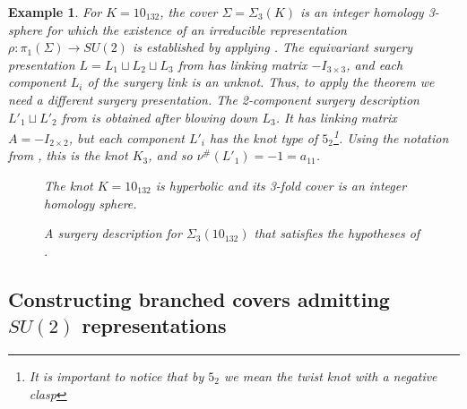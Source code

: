 \documentclass[11pt]{amsart}
\newtheorem{exmp}[theorem]{Example}
\begin{document}
\begin{exmp}\label{exmp:10_132} For $K=10_{132}$, the cover $\Sigma=\Sigma_3(K)$ is an integer homology 3-sphere for which the existence of an irreducible representation $\rho:\pi_1(\Sigma)\to SU(2)$ is established by applying . The equivariant surgery presentation $L=L_1\sqcup L_2\sqcup L_3$ from  has linking matrix $-I_{3\times 3}$, and each component $L_i$ of the surgery link is an unknot. Thus, to apply the theorem we need a different surgery presentation. The 2-component surgery description $L'_1\sqcup L'_2$ from  is obtained after blowing down $L_3$. It has linking matrix $A=-I_{2\times 2}$, but each component $L'_i$ has the knot type of $5_2$\footnote{It is important to notice that by $5_2$ we mean the twist knot with a negative clasp}. Using the notation from \cite[Theorem 1.13]{baldwin2020concordance}, this is the knot $K_3$, and so $\nu^\#(L'_1)=-1=a_{11}$. 

\begin{figure}[h]
\centering
\def\svgwidth{0.25\textwidth}\qquad
\def\svgwidth{0.25\textwidth}\qquad
\def\svgwidth{0.2125\textwidth}
\caption{The knot $K=10_{132}$ is hyperbolic and its 3-fold cover is an integer homology sphere.}\label{10_132}
\end{figure}

\begin{figure}[h]
\centering
%
\def\svgwidth{0.25\textwidth}
\caption{%
A surgery description for $\Sigma_3(10_{132})$ that satisfies the hypotheses of .}\label{10_132-nu}
\end{figure}
\end{exmp}

\subsection{Constructing branched covers admitting $SU(2)$ representations}
\end{document}
